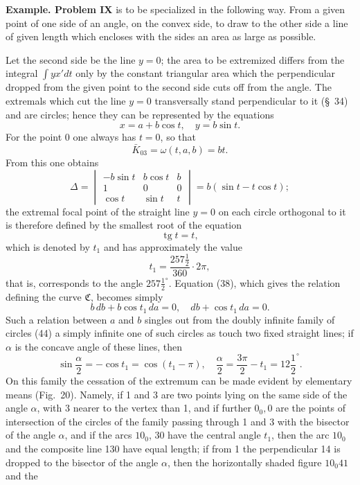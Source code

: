 \documentclass[11pt,a4paper,leqno]{article}
\newcommand{\tg}{\operatorname{tg}}
\begin{document}
\noindent\textbf{Example. Problem IX} is to be specialized in the following way. From a given point of one side of an angle, on the convex side, to draw to the other side a line of given length which encloses with the sides an area as large as possible.

Let the second side be the line $y=0$; the area to be extremized differs from the integral $\int yx' dt$ only by the constant triangular area which the perpendicular dropped from the given point to the second side cuts off from the angle. The extremals which cut the line $y=0$ transversally stand perpendicular to it (\S~34) and are circles; hence they can be represented by the equations
\begin{equation}\tag{44}
x=a+b\cos t,
\quad y=b\sin t.
\end{equation}
For the point 0 one always has $t=0$, so that
\[
\bar K_{03}=\omega(t,a,b)=bt.
\]
From this one obtains
\[
\Delta=\begin{vmatrix}
-b\sin t&b\cos t&b\\
1&0&0\\
\cos t&\sin t&t
\end{vmatrix}=b(\sin t-t\cos t);
\]
the extremal focal point of the straight line $y=0$ on each circle orthogonal to it is therefore defined by the smallest root of the equation
\[
\tg t=t,
\]
which is denoted by $t_1$ and has approximately the value
\[
t_1=\frac{257\frac{1}{2}}{360}\cdot 2\pi,
\]
that is, corresponds to the angle $257\frac{1}{2}^{\circ}$. Equation (38), which gives the relation defining the curve $\mathfrak{C}$, becomes simply
\[
b\,db+b\cos t_1\,da=0,
\quad db+\cos t_1\,da=0.
\]
Such a relation between $a$ and $b$ singles out from the doubly infinite family of circles (44) a simply infinite one of such circles as touch two fixed straight lines; if $\alpha$ is the concave angle of these lines, then
\[
\sin\frac{\alpha}{2}=-\cos t_1=\cos(t_1-\pi),
\quad \frac{\alpha}{2}=\frac{3\pi}{2}-t_1=12\frac{1}{2}^{\circ}.
\]
On this family the cessation of the extremum can be made evident by elementary means (Fig.~20). Namely, if 1 and 3 are two points lying on the same side of the angle $\alpha$, with 3 nearer to the vertex than 1, and if further $0_0,0$ are the points of intersection of the circles of the family passing through 1 and 3 with the bisector of the angle $\alpha$, and if the arcs $10_0$, 30 have the central angle $t_1$, then the arc $10_0$ and the composite line 130 have equal length; if from 1 the perpendicular 14 is dropped to the bisector of the angle $\alpha$, then the horizontally shaded figure $10_0 41$ and the
\end{document}
